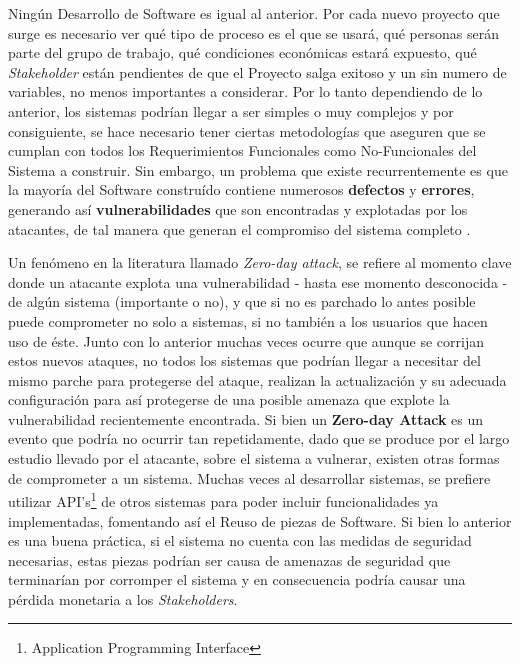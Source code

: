 Ningún Desarrollo de Software es igual al anterior. Por cada nuevo proyecto que surge es necesario ver qué tipo de proceso es el que se usará, qué personas serán parte del grupo de trabajo, qué condiciones económicas estará expuesto, qué \textit{Stakeholder} están pendientes de que el Proyecto salga exitoso y un sin numero de variables, no menos importantes a considerar. Por lo tanto dependiendo de lo anterior, los sistemas podrían llegar a ser simples o muy complejos y por consiguiente, se hace necesario tener ciertas metodologías que aseguren que se cumplan con todos los Requerimientos Funcionales como No-Funcionales del Sistema a construir. Sin embargo, un problema que existe recurrentemente es que la mayoría del Software construído contiene numerosos \textbf{defectos} y \textbf{errores}, generando así \textbf{vulnerabilidades} que son encontradas y explotadas por los atacantes, de tal manera que generan el compromiso del sistema completo \cite{goertzel2007software}.

Un fenómeno en la literatura llamado \textit{Zero-day attack}, se refiere al momento clave donde un atacante explota una vulnerabilidad - hasta ese momento desconocida - de algún sistema (importante o no), y que si no es parchado lo antes posible puede comprometer no solo a sistemas, si no también a los usuarios que hacen uso de éste. Junto con lo anterior muchas veces ocurre que aunque se corrijan estos nuevos ataques, no todos los sistemas que podrían llegar a necesitar del mismo parche para protegerse del ataque, realizan la actualización y su adecuada configuración para así protegerse de una posible amenaza que explote la vulnerabilidad recientemente encontrada. Si bien un \textbf{Zero-day Attack} es un evento que podría no ocurrir tan repetidamente, dado que se produce por el largo estudio llevado por el atacante, sobre el sistema a vulnerar, existen otras formas de comprometer a un sistema. Muchas veces al desarrollar sistemas, se prefiere utilizar API's\footnote{Application Programming Interface} de otros sistemas para poder incluir funcionalidades ya implementadas, fomentando así el Reuso de piezas de Software. Si bien lo anterior es una buena práctica, si el sistema no cuenta con las medidas de seguridad necesarias, estas piezas podrían ser causa de amenazas de seguridad que terminarían por corromper el sistema y en consecuencia podría causar una pérdida monetaria a los \textit{Stakeholders}. 

